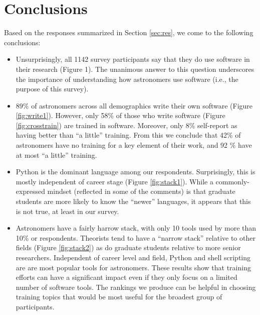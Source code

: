 
\section{Conclusions}
\label{sec:conc}


Based on the responses summarized in Section \ref{sec:res}, we come to the following conclusions:



\begin{itemize}
\item Unsurprisingly, all 1142 survey participants say that they do use software in their research (Figure 1). The unanimous answer to this question underscores the importance of understanding how astronomers use software (i.e., the purpose of this survey).
\item $89\%$ of astronomers across all demographics write their own software (Figure \ref{fig:write1}).  However, only 58\% of those who write software (Figure \ref{fig:crosstrain}) are trained in software.  Moreover, only 8\% self-report as having better than ``a little'' training.  From this we conclude that 42\% of astronomers have no training for a key element of their work, and 92 \% have at most ``a little'' training.  
\item Python is the dominant language among our respondents.  Surprisingly, this is mostly independent of career stage (Figure \ref{fig:stack1}).  While a commonly-expressed mindset (reflected in some of the comments) is that graduate students are more likely to know the ``newer'' languages, it appears that this is not true, at least in our survey.
\item Astronomers have a fairly harrow stack, with only 10 tools used by more than 10\% or respondents. Theorists tend to have a ``narrow stack'' relative to other fields (Figure \ref{fig:stack2}) as do graduate students relative to more senior researchers. Independent of career level and field, Python and shell scripting are are most popular tools for astronomers. These results show that training efforts can have a significant impact even if they only focus on a limited number of software tools. The rankings we produce can be helpful in choosing training topics that would be most useful for the broadest group of participants. 
\end{itemize}

